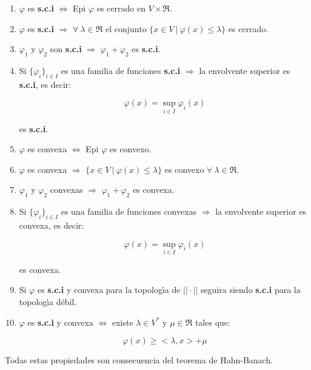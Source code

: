 \begin{enumerate}
\item $\varphi$ es \textbf{s.c.i} $\Longleftrightarrow$ Epi $\varphi$ es
cerrado en $V\times \Re$.
\item $\varphi$ es \textbf{s.c.i} $\Longrightarrow$ $\forall \ \lambda \in \Re$
el conjunto $\{ x\in V \ | \ \varphi (x)\le \lambda \}$ es cerrado.
\item $\varphi_1$ y $\varphi_2$ son \textbf{s.c.i} $\Longrightarrow$
$\varphi_1 +\varphi_2$ es \textbf{s.c.i}.
\item Si $\{\varphi_i \}_{i\in I}$ es una familia de funciones \textbf{s.c.i}
$\Longrightarrow$ la envolvente superior es \textbf{s.c.i}, es decir:

\begin{displaymath}
\varphi(x) = \sup_{i\in I} \varphi_i (x)
\end{displaymath}

es \textbf{s.c.i}.
\item $\varphi$ es convexa $\Longleftrightarrow$ Epi $\varphi$ es convexo.
\item $\varphi$ es convexa $\Longrightarrow$ $\{x\in V\ |\ \varphi (x)\le
\lambda \}$ es convexo $\forall \ \lambda \in \Re$.
\item $\varphi_1$ y $\varphi_2$ convexas $\Longrightarrow$ $\varphi_1+\varphi_2$
es convexa.
\item Si $\{\varphi_i \}_{i\in I}$ es una familia de funciones convexas
$\Longrightarrow$ la envolvente superior es convexa, es decir:

\begin{displaymath}
\varphi(x)= \sup_{i \in I} \varphi_i (x)
\end{displaymath}

es convexa.
\item Si $\varphi$ es \textbf{s.c.i} y convexa para la topolog\'{\i}a de
$||\cdot ||$ seguira siendo \textbf{s.c.i} para la topolog\'{\i}a d\'ebil.
\item $\varphi$ es \textbf{s.c.i} y convexa $\Longleftrightarrow$ existe
$\lambda \in V^*$ y $\mu \in \Re$ tales que:

\begin{displaymath}
\varphi(x) \ge <\lambda ,x> + \mu
\end{displaymath}
\end{enumerate}
Todas estas propiedades son consecuencia del teorema de Hahn-Banach.\\
